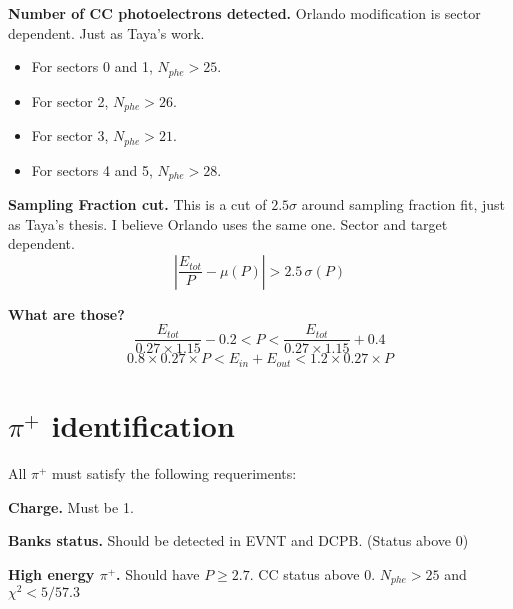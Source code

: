 \textbf{Number of CC photoelectrons detected.} Orlando modification is sector dependent. Just as Taya's work.
\begin{itemize}
    \item For sectors 0 and 1, $N_{phe} > 25$.
    \item For sector 2, $N_{phe} > 26$.
    \item For sector 3, $N_{phe} > 21$.
    \item For sectors 4 and 5, $N_{phe} > 28$.
\end{itemize}

\textbf{Sampling Fraction cut.} This is a cut of $2.5 \sigma$ around sampling fraction fit, just as Taya's thesis. I believe Orlando uses the same one. Sector and target dependent.
\begin{equation}
    \left| \frac{E_{tot}}{P} - \mu(P) \right| > 2.5 \, \sigma(P)
\end{equation}

\textbf{What are those?}
\begin{equation}
	\frac{E_{tot}}{0.27 \times 1.15} - 0.2 < P < \frac{E_{tot}}{0.27 \times 1.15} + 0.4
\end{equation}
\begin{equation}
    0.8 \times 0.27 \times P < E_{in} + E_{out} < 1.2 \times 0.27 \times P
\end{equation}

\section{$\pi^{+}$ identification}

All $\pi^{+}$ must satisfy the following requeriments:

\textbf{Charge.} Must be 1.

\textbf{Banks status.} Should be detected in EVNT and DCPB. (Status above 0)

\textbf{High energy $\pi^+$.} Should have $P \ge 2.7$. CC status above 0. $N_{phe} > 25$ and $\chi^2 < 5/57.3$
                        
